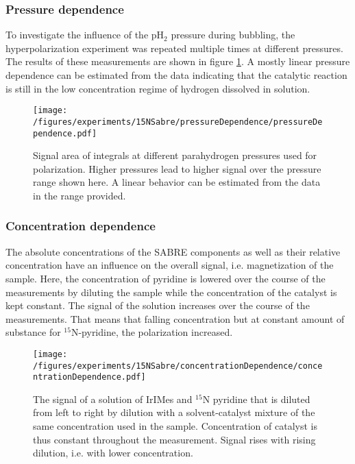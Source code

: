     \subsubsection{Pressure dependence}
    To investigate the influence of the pH$_2$ pressure during bubbling, the hyperpolarization experiment was repeated multiple times at different pressures. The results of these measurements are shown in figure \ref{fig:results:15N:pressureDependence}. A mostly linear pressure dependence can be estimated from the data indicating that the catalytic reaction is still in the low concentration regime of hydrogen dissolved in solution.
        \begin{figure}
            \texttt{[image: /figures/experiments/15NSabre/pressureDependence/pressureDependence.pdf]}
            \caption[Pressure dependence]{Signal area of integrals at different parahydrogen pressures used for polarization. Higher pressures lead to higher signal over the pressure range shown here. A linear behavior can be estimated from the data in the range provided.}
            \label{fig:results:15N:pressureDependence}
        \end{figure}
    \subsubsection{Concentration dependence}
        The absolute concentrations of the SABRE components as well as their relative concentration have an influence on the overall signal, i.e. magnetization of the sample. Here, the concentration of pyridine is lowered over the course of the measurements by diluting the sample while the concentration of the catalyst is kept constant. The signal of the solution increases over the course of the measurements. That means that falling concentration but at constant amount of substance for $^{15}$N-pyridine, the polarization increased.
        \begin{figure}
            \texttt{[image: /figures/experiments/15NSabre/concentrationDependence/concentrationDependence.pdf]}
            \caption[Concentration dependence]{The signal of a solution of IrIMes and $^{15}$N pyridine that is diluted from left to right by dilution with a solvent-catalyst mixture of the same concentration used in the sample. Concentration of catalyst is thus constant throughout the measurement. Signal rises with rising dilution, i.e. with lower concentration.}
            \label{fig:results:15N:concentrationDependence}
        \end{figure}
